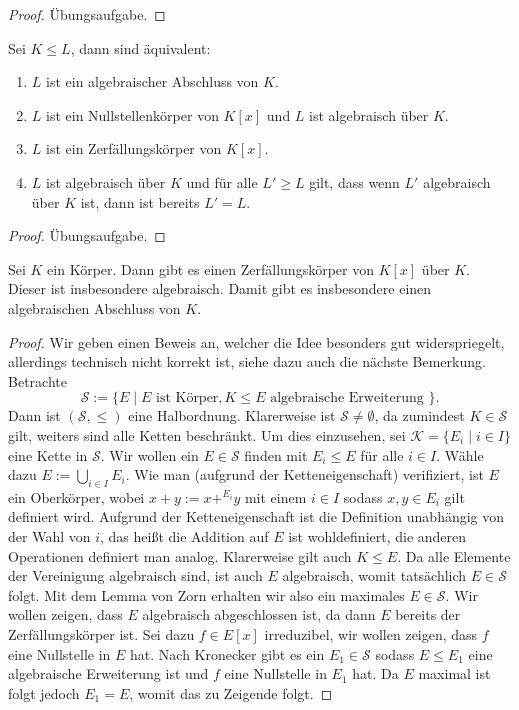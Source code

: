 \begin{proof}
    Übungsaufgabe.
\end{proof}

\begin{proposition}
    Sei $K \leq L$, dann sind äquivalent:
    \begin{enumerate}
        \item $L$ ist ein algebraischer Abschluss von $K$.
        \item $L$ ist ein Nullstellenkörper von $K[x]$ und $L$ ist algebraisch über $K$.
        \item $L$ ist ein Zerfällungskörper von $K[x]$.
        \item $L$ ist algebraisch über $K$ und für alle $L' \geq L$ gilt, dass wenn $L'$ algebraisch über $K$ ist, dann ist bereits $L' = L$.
    \end{enumerate}
\end{proposition}

\begin{proof}
    Übungsaufgabe.
\end{proof}

\begin{proposition}\label{prop:alg_abschluss}
    Sei $K$ ein Körper. Dann gibt es einen Zerfällungskörper von $K[x]$ über $K$. Dieser ist insbesondere algebraisch. Damit gibt es insbesondere einen algebraischen Abschluss von $K$.
\end{proposition}

\begin{proof}
    Wir geben einen Beweis an, welcher die Idee besonders gut widerspriegelt, allerdings technisch nicht korrekt ist, siehe dazu auch die nächste Bemerkung. Betrachte
    $$ \mathcal{S} := \{ E \mid E \text{ ist Körper}, K \leq E \text{ algebraische Erweiterung } \}. $$
    Dann ist $(\mathcal{S}, \leq)$ eine Halbordnung. Klarerweise ist $\mathcal{S} \neq \emptyset$, da zumindest $K\in \mathcal{S}$ gilt, weiters sind alle Ketten beschränkt. Um dies einzusehen, sei $\mathcal{K} = \{ E_i \mid i \in I \}$ eine Kette in $\mathcal{S}$. Wir wollen ein $E \in \mathcal{S}$ finden mit $E_i \leq E$ für alle $i \in I$. Wähle dazu $E := \bigcup_{i \in I} E_i$. Wie man (aufgrund der Ketteneigenschaft) verifiziert, ist $E$ ein Oberkörper, wobei $x+y:=x+^{E_i}y$ mit einem $i\in I$ sodass $x,y\in E_i$ gilt definiert wird. Aufgrund der Ketteneigenschaft ist die Definition unabhängig von der Wahl von $i$, das heißt die Addition auf $E$ ist wohldefiniert, die anderen Operationen definiert man analog. Klarerweise gilt auch $K \leq E$. Da alle Elemente der Vereinigung algebraisch sind, ist auch $E$ algebraisch, womit tatsächlich $E \in \mathcal{S}$ folgt. Mit dem Lemma von Zorn erhalten wir also ein maximales $E \in \mathcal{S}$. Wir wollen zeigen, dass $E$ algebraisch abgeschlossen ist, da dann $E$ bereits der Zerfällungskörper ist. Sei dazu $f \in E[x]$ irreduzibel, wir wollen zeigen, dass $f$ eine Nullstelle in $E$ hat. Nach Kronecker gibt es ein $E_1 \in \mathcal{S}$ sodass $E \leq E_1$ eine algebraische Erweiterung ist und $f$ eine Nullstelle in $E_1$ hat. Da $E$ maximal ist folgt jedoch $E_1 = E$, womit das zu Zeigende folgt.
\end{proof}

